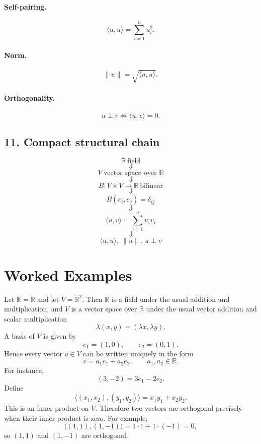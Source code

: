 \documentclass{article}
\begin{document}
	\paragraph{Self-pairing.}
	$$
	\langle u,u\rangle=\sum_{i=1}^n u_i^2.
	$$
	
	\paragraph{Norm.}
	$$
	\|u\|=\sqrt{\langle u,u\rangle}.
	$$
	
	\paragraph{Orthogonality.}
	$$
	u\perp v \iff \langle u,v\rangle=0.
	$$
	
	\subsection*{11. Compact structural chain}
	
	$$
	\mathbb{R}\ \text{field}
	$$
	$$
	\Downarrow
	$$
	$$
	V\ \text{vector space over }\mathbb{R}
	$$
	$$
	\Downarrow
	$$
	$$
	B:V\times V\to\mathbb{R}\ \text{bilinear}
	$$
	$$
	\Downarrow
	$$
	$$
	B(e_i,e_j)=\delta_{ij}
	$$
	$$
	\Downarrow
	$$
	$$
	\langle u,v\rangle=\sum_{i=1}^n u_i v_i
	$$
	$$
	\Downarrow
	$$
	$$
	\langle u,u\rangle,\ \|u\|,\ u\perp v
	$$
	
	\section{Worked Examples}
	
	\begin{example}
		Let $\mathbb{K}=\mathbb{R}$ and let $V=\mathbb{R}^2$. Then $\mathbb{R}$ is a field under the usual addition and multiplication, and $V$ is a vector space over $\mathbb{R}$ under the usual vector addition and scalar multiplication
		$$
		\lambda(x,y)=(\lambda x,\lambda y).
		$$
		A basis of $V$ is given by
		$$
		e_1=(1,0),\qquad e_2=(0,1).
		$$
		Hence every vector $v\in V$ can be written uniquely in the form
		$$
		v=a_1e_1+a_2e_2,
		\qquad a_1,a_2\in\mathbb{R}.
		$$
		For instance,
		$$
		(3,-2)=3e_1-2e_2.
		$$
		Define
		$$
		\langle (x_1,x_2),(y_1,y_2)\rangle=x_1y_1+x_2y_2.
		$$
		This is an inner product on $V$. Therefore two vectors are orthogonal precisely when their inner product is zero. For example,
		$$
		\langle (1,1),(1,-1)\rangle=1\cdot 1+1\cdot(-1)=0,
		$$
		so $(1,1)$ and $(1,-1)$ are orthogonal.
	\end{example}
	
\end{document}
